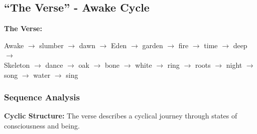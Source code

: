 \documentclass[11pt, letterpaper]{article}
\begin{document}
\subsection{``The Verse'' - Awake Cycle}
\label{sec:poem-verse}

\textbf{The Verse:}
\begin{center}
Awake $\to$ slumber $\to$ dawn $\to$ Eden $\to$ garden $\to$ fire $\to$ time $\to$ deep $\to$\\
Skeleton $\to$ dance $\to$ oak $\to$ bone $\to$ white $\to$ ring $\to$ roots $\to$ night $\to$\\
song $\to$ water $\to$ sing
\end{center}

\subsubsection{Sequence Analysis}

\textbf{Cyclic Structure:} The verse describes a cyclical journey through states of consciousness and being.
\end{document}
